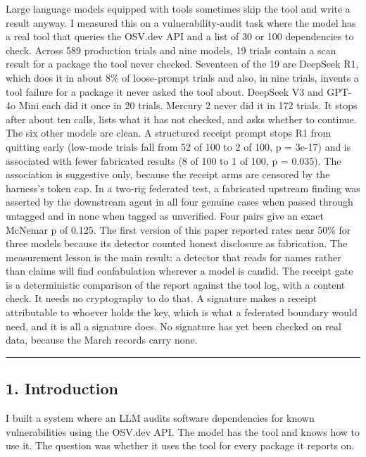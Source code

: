 \documentclass[
]{article}
\newcounter{none} %
\begin{document}
Large language models equipped with tools sometimes skip the tool and
write a result anyway. I measured this on a vulnerability-audit task
where the model has a real tool that queries the OSV.dev API and a list
of 30 or 100 dependencies to check. Across 589 production trials and
nine models, 19 trials contain a scan result for a package the tool
never checked. Seventeen of the 19 are DeepSeek R1, which does it in
about 8\% of loose-prompt trials and also, in nine trials, invents a
tool failure for a package it never asked the tool about. DeepSeek V3
and GPT-4o Mini each did it once in 20 trials. Mercury 2 never did it in
172 trials. It stops after about ten calls, lists what it has not
checked, and asks whether to continue. The six other models are clean. A
structured receipt prompt stops R1 from quitting early (low-mode trials
fall from 52 of 100 to 2 of 100, p = 3e-17) and is associated with fewer
fabricated results (8 of 100 to 1 of 100, p = 0.035). The association is
suggestive only, because the receipt arms are censored by the harness's
token cap. In a two-rig federated test, a fabricated upstream finding
was asserted by the downstream agent in all four genuine cases when
passed through untagged and in none when tagged as unverified. Four
pairs give an exact McNemar p of 0.125. The first version of this paper
reported rates near 50\% for three models because its detector counted
honest disclosure as fabrication. The measurement lesson is the main
result: a detector that reads for names rather than claims will find
confabulation wherever a model is candid. The receipt gate is a
deterministic comparison of the report against the tool log, with a
content check. It needs no cryptography to do that. A signature makes a
receipt attributable to whoever holds the key, which is what a federated
boundary would need, and it is all a signature does. No signature has
yet been checked on real data, because the March records carry none.

\begin{center}\rule{0.5\linewidth}{0.5pt}\end{center}

\subsection{1. Introduction}\label{introduction}

I built a system where an LLM audits software dependencies for known
vulnerabilities using the OSV.dev API. The model has the tool and knows
how to use it. The question was whether it uses the tool for every
package it reports on.
\end{document}

